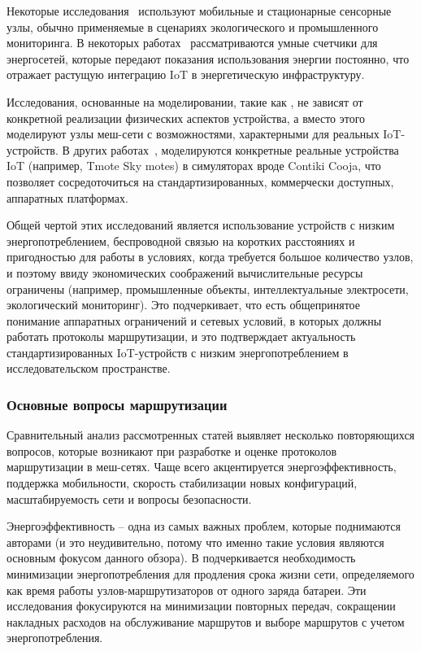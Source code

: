 \documentclass[%
]{report}
\begin{document}
Некоторые исследования~\cite{SHARMA2013416,VENKATESHA201537}
используют мобильные и стационарные сенсорные узлы,
обычно применяемые в сценариях
экологического и промышленного мониторинга.
В некоторых работах~\cite{HECK2025110364,HASAN2018454}
рассматриваются умные счетчики для энергосетей,
которые передают показания использования энергии
постоянно,
что отражает растущую интеграцию IoT
в энергетическую инфраструктуру.

Исследования, основанные на моделировании,
такие как \textcite{DIIANNI1998131,LI2011458,LIU201321},
не зависят от конкретной реализации физических аспектов
устройства,
а вместо этого моделируют узлы меш-сети
с возможностями,
характерными для реальных IoT-устройств.
В других работах~\cite{CHARLES20201819},
моделируются конкретные
реальные устройства IoT
(например, Tmote Sky motes) в симуляторах вроде Contiki Cooja,
что позволяет сосредоточиться на стандартизированных,
коммерчески доступных, аппаратных платформах.

Общей чертой этих исследований является использование
устройств с низким энергопотреблением,
беспроводной связью на коротких расстояниях
и пригодностью для работы в условиях,
когда требуется большое количество узлов,
и поэтому ввиду экономических соображений
вычислительные ресурсы ограничены
(например, промышленные объекты,
интеллектуальные электросети,
экологический мониторинг).
Это подчеркивает, что есть общепринятое понимание
аппаратных ограничений и сетевых условий,
в которых должны работать протоколы маршрутизации,
и это подтверждает актуальность стандартизированных
IoT-устройств с низким энергопотреблением в
исследовательском пространстве.


\subsubsection{Основные вопросы маршрутизации}\label{main-network-routing-considerations}

Сравнительный анализ рассмотренных статей
выявляет несколько повторяющихся вопросов,
которые возникают при разработке
и оценке протоколов маршрутизации в меш-сетях.
Чаще всего акцентируется
энергоэффективность, поддержка мобильности,
скорость стабилизации новых конфигураций,
масштабируемость сети
и вопросы безопасности.

Энергоэффективность -- одна из самых важных проблем,
которые поднимаются авторами
(и это неудивительно,
потому что именно такие условия
являются основным фокусом данного обзора).
В \textcite{KRENTZ202457}
подчеркивается необходимость минимизации
энергопотребления для продления срока жизни сети,
определяемого как время работы узлов-маршрутизаторов
от одного заряда батареи.
Эти исследования фокусируются на минимизации
повторных передач, сокращении накладных расходов
на обслуживание маршрутов и выборе маршрутов
с учетом энергопотребления.
\end{document}
